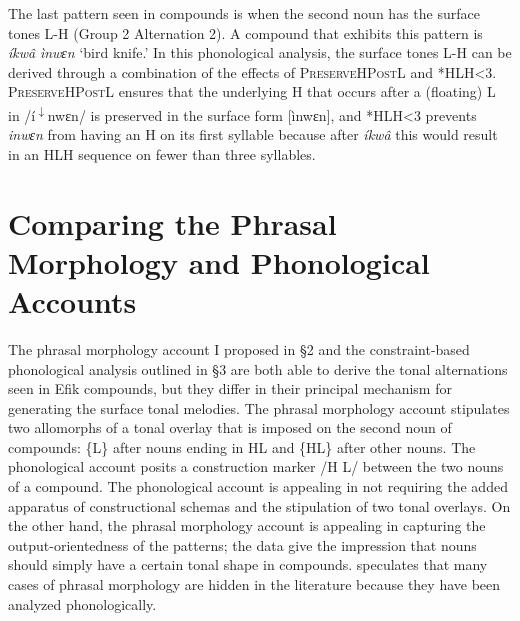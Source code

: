\documentclass[output=paper]{langscibook}
\begin{document}
The last pattern seen in compounds is when the second noun has the surface tones L-H (Group 2 Alternation 2). A compound that exhibits this pattern is \textit{íkwâ} \textit{ìnwɛn} ‘bird knife.’ In this phonological analysis, the surface tones L-H can be derived through a combination of the effects of \textsc{PreserveHPostL} and *HLH<3. \textsc{PreserveHPostL} ensures that the underlying H that occurs after a (floating) L in /í\textsuperscript{$\downarrow$}nwɛn/ is preserved in the surface form [ìnwɛn], and *HLH<3 prevents \textit{inwɛn} from having an H on its first syllable because after \textit{íkwâ} this would result in an HLH sequence on fewer than three syllables.

\section{Comparing the Phrasal Morphology and Phonological Accounts}


The phrasal morphology account I proposed in §2 and the constraint-based phonological analysis outlined in §3 are both able to derive the tonal alternations seen in Efik compounds, but they differ in their principal mechanism for generating the surface tonal melodies. The phrasal morphology account stipulates two allomorphs of a tonal overlay that is imposed on the second noun of compounds: \{L\} after nouns ending in HL and \{HL\} after other nouns. The phonological account posits a construction marker /H L/ between the two nouns of a compound. The phonological account is appealing in not requiring the added apparatus of constructional schemas and the stipulation of two tonal overlays. On the other hand, the phrasal morphology account is appealing in capturing the output-orientedness of the patterns; the data give the impression that nouns should simply have a certain tonal shape in compounds. \citet{McPherson2014} speculates that many cases of phrasal morphology are hidden in the literature because they have been analyzed phonologically. 
\end{document}
